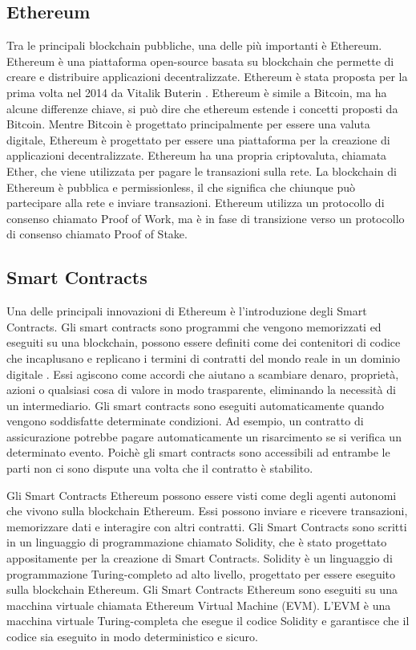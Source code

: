 \documentclass[../../Thesis.tex]{subfiles}
\begin{document}
\subsection{Ethereum}
Tra le principali blockchain pubbliche, una delle più importanti è Ethereum. Ethereum è una piattaforma open-source basata su blockchain che permette di creare e distribuire applicazioni decentralizzate. Ethereum è stata proposta per la prima volta nel 2014 da Vitalik Buterin \cite{Ethereum}. Ethereum è simile a Bitcoin, ma ha alcune differenze chiave, si può dire che ethereum estende i concetti proposti da Bitcoin. Mentre Bitcoin è progettato principalmente per essere una valuta digitale, Ethereum è progettato per essere una piattaforma per la creazione di applicazioni decentralizzate. Ethereum ha una propria criptovaluta, chiamata Ether, che viene utilizzata per pagare le transazioni sulla rete. La blockchain di Ethereum è pubblica e permissionless, il che significa che chiunque può partecipare alla rete e inviare transazioni. Ethereum utilizza un protocollo di consenso chiamato Proof of Work, ma è in fase di transizione verso un protocollo di consenso chiamato Proof of Stake.\\


\subsection{Smart Contracts}

Una delle principali innovazioni di Ethereum è l'introduzione degli Smart Contracts.
Gli smart contracts sono programmi che vengono memorizzati ed eseguiti su una blockchain, possono essere definiti come dei contenitori di codice che incaplusano e replicano i termini di contratti del mondo reale in un dominio digitale \cite{SCReview}. Essi agiscono come accordi  che aiutano a scambiare denaro, proprietà, azioni o qualsiasi cosa di valore in modo trasparente, eliminando la necessità di un intermediario. Gli smart contracts sono eseguiti automaticamente quando vengono soddisfatte determinate condizioni. Ad esempio, un contratto di assicurazione potrebbe pagare automaticamente un risarcimento se si verifica un determinato evento. Poichè gli smart contracts sono accessibili ad entrambe le parti non ci sono dispute una volta che il contratto è stabilito. 

Gli Smart Contracts Ethereum possono essere visti come degli agenti autonomi che vivono sulla blockchain Ethereum. Essi possono inviare e ricevere transazioni, memorizzare dati e interagire con altri contratti. Gli Smart Contracts sono scritti in un linguaggio di programmazione chiamato Solidity, che è stato progettato appositamente per la creazione di Smart Contracts. Solidity è un linguaggio di programmazione Turing-completo ad alto livello, progettato per essere eseguito sulla blockchain Ethereum. Gli Smart Contracts Ethereum sono eseguiti su una macchina virtuale chiamata Ethereum Virtual Machine (EVM). L'EVM è una macchina virtuale Turing-completa che esegue il codice Solidity e garantisce che il codice sia eseguito in modo deterministico e sicuro. 
\end{document}
